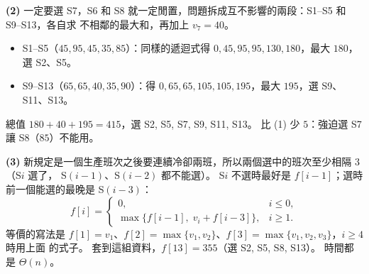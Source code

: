 \begin{pastsoln}
\textbf{(2)} 一定要選 S7，S6 和 S8 就一定閒置，問題拆成互不影響的兩段：S1--S5 和 S9--S13，各自求
不相鄰的最大和，再加上 $v_7 = 40$。
\begin{itemize}
\item S1--S5（$45, 95, 45, 35, 85$）：同樣的遞迴式得 $0, 45, 95, 95, 130, 180$，最大 $180$，選 S2、S5。
\item S9--S13（$65, 65, 40, 35, 90$）：得 $0, 65, 65, 105, 105, 195$，最大 $195$，選 S9、S11、S13。
\end{itemize}
總值 $180 + 40 + 195 = 415$，選 S2, S5, S7, S9, S11, S13。 比 (1) 少 $5$：強迫選 S7 讓 S8（$85$）不能用。

\textbf{(3)} 新規定是一個生產班次之後要連續冷卻兩班，所以兩個選中的班次至少相隔 $3$（S$i$ 選了，
S$(i-1)$、S$(i-2)$ 都不能選）。 S$i$ 不選時最好是 $f[i-1]$；選時前一個能選的最晚是 S$(i-3)$：
\[
f[i] =
\begin{cases}
0, & i \le 0, \\
\max\{f[i-1],\; v_i + f[i-3]\}, & i \ge 1 .
\end{cases}
\]
等價的寫法是 $f[1] = v_1$、$f[2] = \max\{v_1, v_2\}$、$f[3] = \max\{v_1, v_2, v_3\}$，$i \ge 4$ 時用上面
的式子。 套到這組資料，$f[13] = 355$（選 S2, S5, S8, S13）。 時間都是 $\Theta(n)$。
\end{pastsoln}
